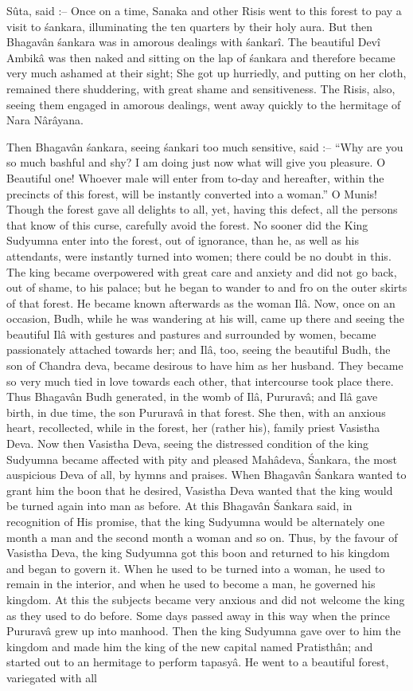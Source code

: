 S\^uta, said :-- Once on a time, Sanaka and other Risis went to this forest to pay a visit to \'sankara, illuminating the ten quarters by their holy aura. But then Bhagav\^an \'sankara was in amorous dealings with \'sankar\^i. The beautiful Dev\^i Ambik\^a was then naked and sitting on the lap of \'sankara and therefore became very much ashamed at their sight; She got up hurriedly, and putting on her cloth, remained there shuddering, with great shame and sensitiveness. The Risis, also, seeing them engaged in amorous dealings, went away quickly to the hermitage of Nara N\^ar\^ayana.

Then Bhagav\^an \'sankara, seeing \'sankari too much sensitive, said :-- ``Why are you so much bashful and shy? I am doing just now what will give you pleasure. O Beautiful one! Whoever male will enter from to-day and hereafter, within the precincts of this forest, will be instantly converted into a woman.'' O Munis! Though the forest gave all delights to all, yet, having this defect, all the persons that know of this curse, carefully avoid the forest. No sooner did the King Sudyumna enter into the forest, out of ignorance, than he, as well as his attendants, were instantly turned into women; there could be no doubt in this. The king became overpowered with great care and anxiety and did not go back, out of shame, to his palace; but he began to wander to and fro on the outer skirts of that forest. He became known afterwards as the woman Il\^a. Now, once on an occasion, Budh, while he was wandering at his will, came up there and seeing the beautiful Il\^a with gestures and pastures and surrounded by women, became passionately attached towards her; and Il\^a, too, seeing the beautiful Budh, the son of Chandra deva, became desirous to have him as her husband. They became so very much tied in love towards each other, that intercourse took place there. Thus Bhagav\^an Budh generated, in the womb of Il\^a, Pururav\^a; and Il\^a gave birth, in due time, the son Pururav\^a in that forest. She then, with an anxious heart, recollected, while in the forest, her (rather his), family priest Vasistha Deva. Now then Vasistha Deva, seeing the distressed condition of the king Sudyumna became affected with pity and pleased Mah\^adeva, \'Sankara, the most auspicious Deva of all, by hymns and praises. When Bhagav\^an \'Sankara wanted to grant him the boon that he desired, Vasistha Deva wanted that the king would be turned again into man as before. At this Bhagav\^an \'Sankara said, in recognition of His promise, that the king Sudyumna would be alternately one month a man and the second month a woman and so on. Thus, by the favour of Vasistha Deva, the king Sudyumna got this boon and returned to his kingdom and began to govern it. When he used to be turned into a woman, he used to remain in the interior, and when he used to become a man, he governed his kingdom. At this the subjects became very anxious and did not welcome the king as they used to do before. Some days passed away in this way when the prince Pururav\^a grew up into manhood. Then the king Sudyumna gave over to him the kingdom and made him the king of the new capital named Pratisth\^an; and started out to an hermitage to perform tapasy\^a. He went to a beautiful forest, variegated with all 